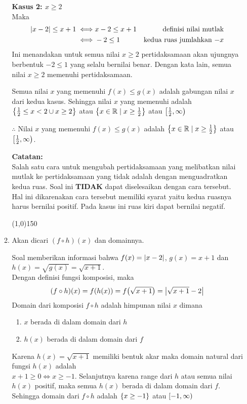 \begin{enumerate}[leftmargin=*, label={\arabic*}.]
\begin{enumerate}[label={\alph*}.]
    \textbf{Kasus 2: $x \geq 2$}\\
    Maka
    \begin{align*}
        \abs{x-2} \leq x+1
        \iff &x-2 \leq x+1 
        &\text{definisi nilai mutlak} \\
        \iff &-2 \leq 1
        &\text{kedua ruas jumlahkan $-x$}
    \end{align*}
    Ini menandakan untuk semua nilai $x \geq 2$ pertidaksamaan akan ujungnya 
    berbentuk $-2 \leq 1$ yang selalu bernilai benar. Dengan kata lain, semua 
    nilai $x \geq 2$ memenuhi pertidaksamaan.
    
    Semua nilai $x$ yang memenuhi $f(x) \leq g(x)$ adalah gabungan nilai $x$ 
    dari kedua kasus. Sehingga nilai $x$ yang memenuhi adalah 
    $\set*{\frac{1}{2} \leq x < 2 \cup x \geq 2}$ atau 
    $\set*{x \in \mathbb{R} \mid x \geq \frac{1}{2}}$
    atau $\cio*{\frac{1}{2}, \infty}$
        
    $\therefore$ Nilai $x$ yang memenuhi $f(x) \leq g(x)$ adalah
    $\set*{x \in \mathbb{R} \mid x \geq \frac{1}{2}}$ atau
    $\cio*{\frac{1}{2}, \infty}$.
    
    \vspace{0.1cm}
    \textbf{Catatan:}\\
    Salah satu cara untuk mengubah pertidaksamaan yang melibatkan nilai mutlak 
    ke pertidaksamaan yang tidak adalah dengan menguadratkan kedua ruas. Soal 
    ini \textbf{TIDAK} dapat diselesaikan dengan cara tersebut. Hal ini 
    dikarenakan cara tersebut memiliki syarat yaitu kedua ruasnya harus bernilai 
    positif. Pada kasus ini ruas kiri dapat bernilai negatif.
    

\begin{center}\line(1,0){150}\end{center}


    \item Akan dicari $(f \circ h)(x)$ dan domainnya.
    
    Soal memberikan informasi bahwa $f(x) = \abs{x-2}$, $g(x) = x+1$ dan 
    $h(x) = \sqrt{g(x)} = \sqrt{x+1}$.\\
    Dengan definisi fungsi komposisi, maka
    \[
        (f \circ h)(x) = f(h(x)) = f\brk*{\sqrt{x+1}} = \abs*{\sqrt{x+1}-2}
    \]
    Domain dari komposisi $f \circ h$ adalah himpunan nilai $x$ dimana
        \begin{enumerate}[label={\arabic*})]
        \item $x$ berada di dalam domain dari $h$
        \item $h(x)$ berada di dalam domain dari $f$
        \end{enumerate}
    Karena $h(x) = \sqrt{x+1}$ memiliki bentuk akar maka domain natural dari 
    fungsi $h(x)$ adalah \\ $x+1 \geq 0 \iff x \geq -1$.
    Selanjutnya karena range dari $h$ atau semua nilai $h(x)$ positif, maka
    semua $h(x)$ berada di dalam domain dari $f$. Sehingga domain dari 
    $f \circ h$ adalah $\set*{x \geq -1}$ atau $\cio{-1,\infty}$
        

\end{enumerate}
\end{enumerate}
